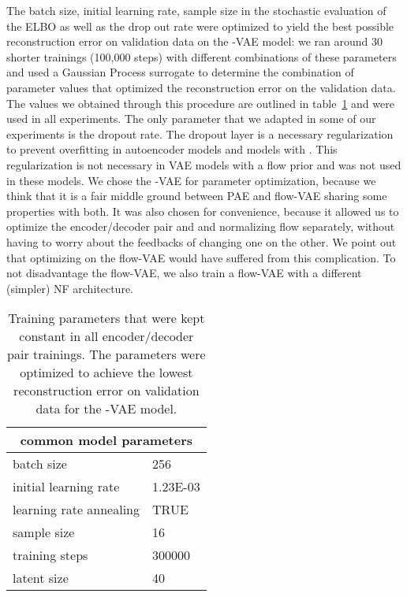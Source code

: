 \documentclass[10pt]{article} \usepackage[accepted]{tmlr}
\begin{document}
The batch size, initial learning rate, sample size in the stochastic evaluation of the ELBO as well as the drop out rate were optimized to yield the best possible reconstruction error on validation data on the -VAE model: we ran around 30 shorter trainings (100,000 steps) with different combinations of these parameters and used a Gaussian Process surrogate to determine the combination of parameter values that optimized the reconstruction error on the validation data. The values we obtained through this procedure are outlined in table~\ref{tab:com_params} and were used in all experiments. The only parameter that we adapted in some of our experiments is the dropout rate. The dropout layer is a necessary regularization to prevent overfitting in autoencoder models and models with . This regularization is not necessary in VAE models with a flow prior and was not used in these models. We chose the -VAE for parameter optimization, because we think that it is a fair middle ground between PAE and flow-VAE sharing some properties with both. It was also chosen for convenience, because it allowed us to optimize the encoder/decoder pair and and normalizing flow separately, without having to worry about the feedbacks of changing one on the other. We point out that optimizing on the flow-VAE would have suffered from this complication. To not disadvantage the flow-VAE, we also train a flow-VAE with a different (simpler) NF architecture. \begin{table}[h]
\begin{center}
\begin{tabular}{ll}
\multicolumn{2}{c}{\textbf{common model parameters}} \\ \hline
batch size                       & 256               \\
initial learning rate            & 1.23E-03          \\
learning rate annealing          & TRUE              \\
sample size                      & 16                \\
training steps                   & 300000            \\
latent size                      & 40               
\end{tabular}
\end{center}
\caption{\label{tab:com_params} Training parameters that were kept constant in all encoder/decoder pair trainings. The parameters were optimized to achieve the lowest reconstruction error on validation data for the -VAE model.}
\end{table}
\end{document}
